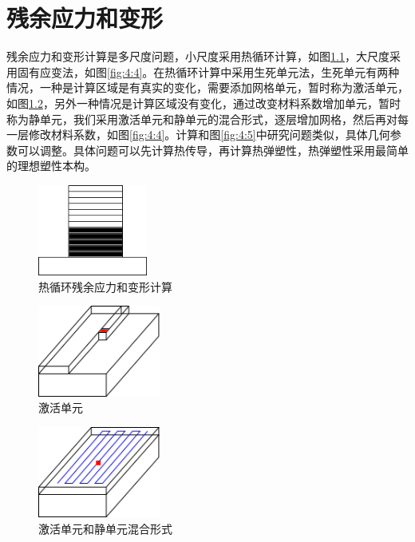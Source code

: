 \chapter{残余应力和变形}

残余应力和变形计算是多尺度问题，小尺度采用热循环计算，如图\ref{fig:4:1}，大尺度采用固有应变法，如图\ref{fig:4:4}。在热循环计算中采用生死单元法，生死单元有两种情况，一种是计算区域是有真实的变化，需要添加网格单元，暂时称为激活单元，如图\ref{fig:4:2}，另外一种情况是计算区域没有变化，通过改变材料系数增加单元，暂时称为静单元，我们采用激活单元和静单元的混合形式，逐层增加网格，然后再对每一层修改材料系数，如图\ref{fig:4:4}。计算和图\ref{fig:4:5}中研究问题类似，具体几何参数可以调整。具体问题可以先计算热传导，再计算热弹塑性，热弹塑性采用最简单的理想塑性本构。

\begin{figure}[!htbp]
  \centering
  \includegraphics[height=3cm]{fig/4/1.png}
  \caption{热循环残余应力和变形计算}
  \label{fig:4:1}
\end{figure}

\begin{figure}[!htbp]
  \centering
  \includegraphics[height=3cm]{fig/4/2.png}
  \caption{激活单元}
  \label{fig:4:2}
\end{figure}

\begin{figure}[!htbp]
  \centering
  \includegraphics[height=3cm]{fig/4/3.png}
  \caption{激活单元和静单元混合形式}
  \label{fig:4:3}
\end{figure}

